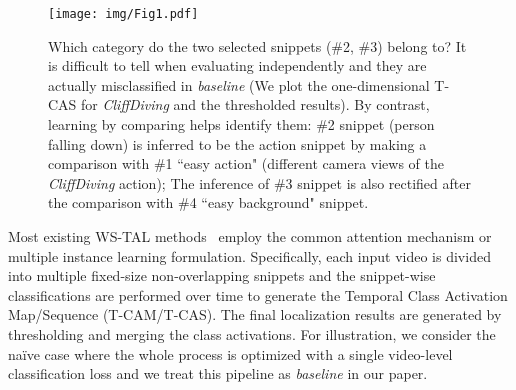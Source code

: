 \documentclass[final]{cvpr}
\begin{document}
\begin{figure}[t]
\begin{center}
\texttt{[image: img/Fig1.pdf]}
\end{center}
 \caption{Which category do the two selected snippets (\#2, \#3) belong to? It is difficult to tell when evaluating independently and they are actually misclassified in \textit{baseline} (We plot the one-dimensional T-CAS for \textit{CliffDiving} and the thresholded results). By contrast, learning by comparing helps identify them: \#2 snippet (person falling down) is inferred to be the action snippet by making a comparison with \#1 ``easy action" (different camera views of the \textit{CliffDiving} action); The inference of \#3 snippet is also rectified after the comparison with \#4 ``easy background" snippet.}
\label{fig:intro}
\end{figure}

Most existing WS-TAL methods~\cite{wang2017untrimmednets,nguyen2018weakly,paul2018w,narayan20193c,lee2020background} employ the common attention mechanism or multiple instance learning formulation. Specifically, each input video is divided into multiple fixed-size non-overlapping snippets and the snippet-wise classifications are performed over time to generate the Temporal Class Activation Map/Sequence (T-CAM/T-CAS)\cite{nguyen2018weakly,shou2018autoloc}. The final localization results are generated by thresholding and merging the class activations. For illustration, we consider the na\"ive case where the whole process is optimized with a single video-level classification loss and we treat this pipeline as \textit{baseline} in our paper.
\end{document}
